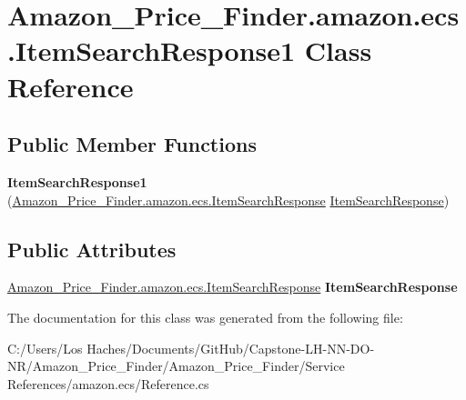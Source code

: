 \hypertarget{class_amazon___price___finder_1_1amazon_1_1ecs_1_1_item_search_response1}{\section{Amazon\-\_\-\-Price\-\_\-\-Finder.\-amazon.\-ecs.\-Item\-Search\-Response1 Class Reference}
\label{class_amazon___price___finder_1_1amazon_1_1ecs_1_1_item_search_response1}
}
\subsection*{Public Member Functions}
\begin{DoxyCompactItemize}
\item 
\hypertarget{class_amazon___price___finder_1_1amazon_1_1ecs_1_1_item_search_response1_a13d544be634f155c68a1b8dac880f9db}{{\bfseries Item\-Search\-Response1} (\hyperlink{class_amazon___price___finder_1_1amazon_1_1ecs_1_1_item_search_response}{Amazon\-\_\-\-Price\-\_\-\-Finder.\-amazon.\-ecs.\-Item\-Search\-Response} \hyperlink{class_amazon___price___finder_1_1amazon_1_1ecs_1_1_item_search_response}{Item\-Search\-Response})}\label{class_amazon___price___finder_1_1amazon_1_1ecs_1_1_item_search_response1_a13d544be634f155c68a1b8dac880f9db}

\end{DoxyCompactItemize}
\subsection*{Public Attributes}
\begin{DoxyCompactItemize}
\item 
\hypertarget{class_amazon___price___finder_1_1amazon_1_1ecs_1_1_item_search_response1_a63838ec1d7346b5ebafcd9c312ea2672}{\hyperlink{class_amazon___price___finder_1_1amazon_1_1ecs_1_1_item_search_response}{Amazon\-\_\-\-Price\-\_\-\-Finder.\-amazon.\-ecs.\-Item\-Search\-Response} {\bfseries Item\-Search\-Response}}\label{class_amazon___price___finder_1_1amazon_1_1ecs_1_1_item_search_response1_a63838ec1d7346b5ebafcd9c312ea2672}

\end{DoxyCompactItemize}


The documentation for this class was generated from the following file\-:\begin{DoxyCompactItemize}
\item 
C\-:/\-Users/\-Los Haches/\-Documents/\-Git\-Hub/\-Capstone-\/\-L\-H-\/\-N\-N-\/\-D\-O-\/\-N\-R/\-Amazon\-\_\-\-Price\-\_\-\-Finder/\-Amazon\-\_\-\-Price\-\_\-\-Finder/\-Service References/amazon.\-ecs/Reference.\-cs\end{DoxyCompactItemize}
